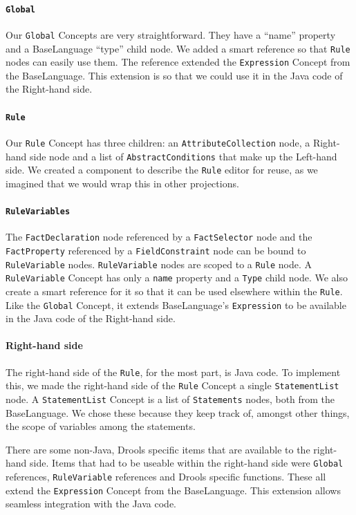 \paragraph{\texttt{Global}} Our \texttt{Global} Concepts are very straightforward.
They have a ``name'' property and a BaseLanguage ``type'' child node.
We added a smart reference so that \texttt{Rule} nodes can easily use them.
The reference extended the \texttt{Expression} Concept from the BaseLanguage.
This extension is so that we could use it in the Java code of the Right-hand side.

\paragraph{\texttt{Rule}} Our \texttt{Rule} Concept has three children: an \texttt{AttributeCollection} node, a Right-hand side node and a list of \texttt{AbstractConditions} that make up the Left-hand side.
We created a component to describe the \texttt{Rule} editor for reuse, as we imagined that we would wrap this in other projections.

\paragraph{\texttt{RuleVariables}} The \texttt{FactDeclaration} node referenced by a \texttt{FactSelector} node and the \texttt{FactProperty} referenced by a \texttt{FieldConstraint} node can be bound to \texttt{RuleVariable} nodes.
\texttt{RuleVariable} nodes are scoped to a \texttt{Rule} node.
A \texttt{RuleVariable} Concept has only a \texttt{name} property and a \texttt{Type} child node.
We also create a smart reference for it so that it can be used elsewhere within the \texttt{Rule}.
Like the \texttt{Global} Concept, it extends BaseLanguage's \texttt{Expression} to be available in the Java code of the Right-hand side.

\paragraph{Right-hand side} The right-hand side of the \texttt{Rule}, for the most part, is Java code.
To implement this, we made the right-hand side of the \texttt{Rule} Concept a single \texttt{StatementList} node.
A \texttt{StatementList} Concept is a list of \texttt{Statements} nodes, both from the BaseLanguage.
We chose these because they keep track of, amongst other things, the scope of variables among the statements.

There are some non-Java, Drools specific items that are available to the right-hand side.
Items that had to be useable within the right-hand side were \texttt{Global} references, \texttt{RuleVariable} references and Drools specific functions.
These all extend the \texttt{Expression} Concept from the BaseLanguage.
This extension allows seamless integration with the Java code.

